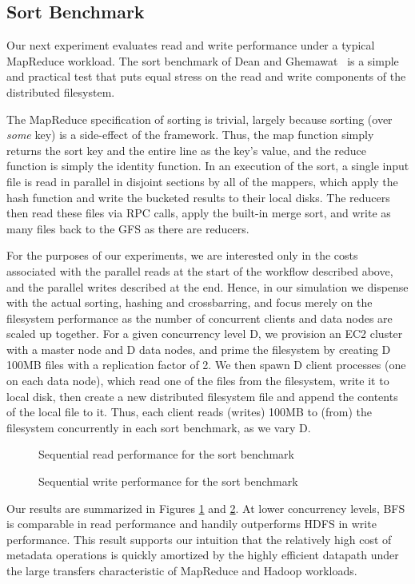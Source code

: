 \documentclass{article}
\begin{document}
\subsection{Sort Benchmark}
Our next experiment evaluates read and write performance under a
typical MapReduce workload.  The sort benchmark of Dean and
Ghemawat~\cite{mapreduce} is a simple and practical test that puts
equal stress on the read and write components of the distributed
filesystem.

The MapReduce specification of sorting is trivial, largely because
sorting (over \emph{some} key) is a side-effect of the framework.
Thus, the map function simply returns the sort key and the entire line
as the key's value, and the reduce function is simply the identity
function.  In an execution of the sort, a single input file is read in
parallel in disjoint sections by all of the mappers, which apply the
hash function and write the bucketed results to their local disks.
The reducers then read these files via RPC calls, apply the built-in
merge sort, and write as many files back to the GFS as there are
reducers.

For the purposes of our experiments, we are interested only in the
costs associated with the parallel reads at the start of the workflow
described above, and the parallel writes described at the end.  Hence,
in our simulation we dispense with the actual sorting, hashing and
crossbarring, and focus merely on the filesystem performance as the
number of concurrent clients and data nodes are scaled up together.
For a given concurrency level D, we provision an EC2 cluster with a
master node and D data nodes, and prime the filesystem by creating D
100MB files with a replication factor of 2.  We then spawn D client
processes (one on each data node), which read one of the files from the
filesystem, write it to local disk, then create a new distributed
filesystem file and append the contents of the local file to it.
Thus, each client reads (writes) 100MB to (from) the filesystem
concurrently in each sort benchmark, as we vary D.

\begin{figure}
\centering
{}
\caption{Sequential read performance for the sort benchmark}
\label{fig:big-read-perf}
\end{figure}
\begin{figure}
\centering
{}
\caption{Sequential write performance for the sort benchmark}
\label{fig:big-write-perf}
\end{figure}
Our results are summarized in Figures \ref{fig:big-read-perf} and
\ref{fig:big-write-perf}.  At lower concurrency levels, BFS is
comparable in read performance and handily outperforms HDFS in write
performance.  This result supports our intuition that the relatively
high cost of metadata operations is quickly amortized by the highly
efficient datapath under the large transfers characteristic of
MapReduce and Hadoop workloads.
\end{document}
